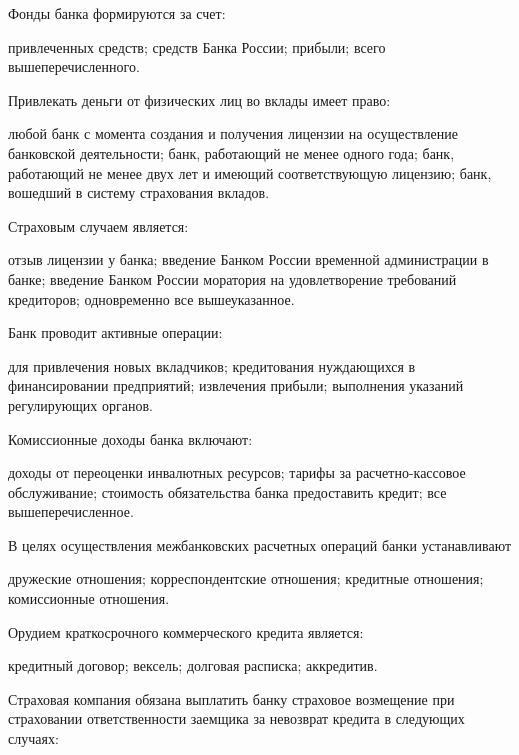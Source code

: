 \documentclass[12pt, table]{exam}
\begin{document}
\begin{questions}
\begin{multicols}{2}
\begin{choices}
	 \end{choices}
\question Фонды банка формируются за счет:
	 \begin{choices}
	 \choice привлеченных средств;
	 \choice средств Банка России;
	 \choice прибыли;
	 \CC всего вышеперечисленного.
	 \end{choices}
\question Привлекать деньги от физических лиц во вклады имеет право:
	 \begin{choices}
	 \choice любой банк с момента создания и получения лицензии на осуществление банковской деятельности;
	 \choice банк, работающий не менее одного года;
	 \CC банк, работающий не менее двух лет и имеющий соответствующую лицензию;
	 \choice банк, вошедший в систему страхования вкладов.
	 \end{choices}
\question Страховым случаем является:
	 \begin{choices}
	 \choice отзыв лицензии у банка;
	 \choice введение Банком России временной администрации в банке;
	 \CC введение Банком России моратория на удовлетворение требований кредиторов;
	 \choice одновременно все вышеуказанное.
	 \end{choices}
\question Банк проводит активные операции:
	 \begin{choices}
	 \choice для привлечения новых вкладчиков;
	 \choice кредитования нуждающихся в финансировании предприятий;
	 \choice извлечения прибыли;
	 \CC выполнения указаний регулирующих органов.
	 \end{choices}
\question Комиссионные доходы банка включают:
	 \begin{choices}
	 \choice доходы от переоценки инвалютных ресурсов;
	 \choice тарифы за расчетно-кассовое обслуживание;
	 \CC стоимость обязательства банка предоставить кредит;
	 \choice все вышеперечисленное.
	 \end{choices}
\question В целях осуществления межбанковских расчетных операций банки устанавливают
	 \begin{choices}
	 \choice дружеские отношения;
	 \choice корреспондентские отношения;
	 \choice кредитные отношения;
	 \CC комиссионные отношения.
	 \end{choices}
\question Орудием краткосрочного коммерческого кредита является:
	 \begin{choices}
	 \CC кредитный договор;
	 \choice вексель;
	 \choice долговая расписка;
	 \choice аккредитив.
	 \end{choices}
\question Страховая компания обязана выплатить банку страховое возмещение при страховании ответственности заемщика за невозврат кредита в следующих случаях:

\end{multicols}
\end{questions}
\end{document}
